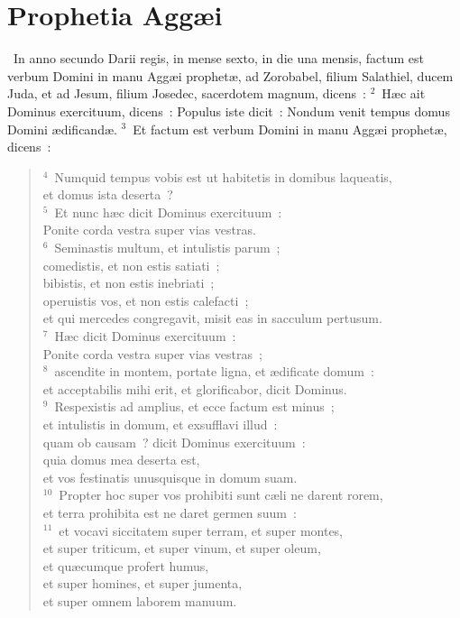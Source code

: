 \clearpage
{\centering \section*{Prophetia Aggæi}}\thispagestyle{empty}

~In anno secundo Darii regis, in mense sexto, in die una mensis, factum est verbum Domini in manu Agg\ae i prophet\ae , ad Zorobabel, filium Salathiel, ducem Juda, et ad Jesum, filium Josedec, sacerdotem magnum, dicens~:
${}^{2}$~H\ae c ait Dominus exercituum, dicens~: Populus iste dicit~: Nondum venit tempus domus Domini \ae dificand\ae .
${}^{3}$~Et factum est verbum Domini in manu Agg\ae i prophet\ae , dicens~:
\begin{flushleft}\begin{verse}${}^{4}$~Numquid tempus vobis est ut habitetis in domibus laqueatis,\\ et domus ista deserta~?\\
${}^{5}$~Et nunc h\ae c dicit Dominus exercituum~:\\ Ponite corda vestra super vias vestras.\\
${}^{6}$~Seminastis multum, et intulistis parum~;\\ comedistis, et non estis satiati~;\\ bibistis, et non estis inebriati~;\\ operuistis vos, et non estis calefacti~;\\ et qui mercedes congregavit, misit eas in sacculum pertusum.\\
${}^{7}$~H\ae c dicit Dominus exercituum~:\\ Ponite corda vestra super vias vestras~;\\
${}^{8}$~ascendite in montem, portate ligna, et \ae dificate domum~:\\ et acceptabilis mihi erit, et glorificabor, dicit Dominus.\\
${}^{9}$~Respexistis ad amplius, et ecce factum est minus~;\\ et intulistis in domum, et exsufflavi illud~:\\ quam ob causam~? dicit Dominus exercituum~:\\ quia domus mea deserta est,\\ et vos festinatis unusquisque in domum suam.\\
${}^{10}$~Propter hoc super vos prohibiti sunt c\ae li ne darent rorem,\\ et terra prohibita est ne daret germen suum~:\\
${}^{11}$~et vocavi siccitatem super terram, et super montes,\\ et super triticum, et super vinum, et super oleum,\\ et qu\ae cumque profert humus,\\ et super homines, et super jumenta,\\ et super omnem laborem manuum.\end{verse}\end{flushleft}


